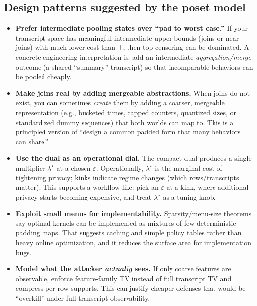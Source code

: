 \documentclass[11pt]{article}
\theoremstyle{definition}
\theoremstyle{remark}
\begin{document}
\subsection*{Design patterns suggested by the poset model}
\begin{itemize}[leftmargin=*]
\item \textbf{Prefer intermediate pooling states over ``pad to worst case.''}
If your transcript space has meaningful intermediate upper bounds (joins or near-joins) with much lower cost than $\top$, then top-censoring can be dominated.
A concrete engineering interpretation is: add an intermediate \emph{aggregation/merge} outcome (a shared ``summary'' transcript) so that incomparable behaviors can be pooled cheaply.
\item \textbf{Make joins real by adding mergeable abstractions.}
When joins do not exist, you can sometimes \emph{create} them by adding a coarser, mergeable representation (e.g., bucketed times, capped counters, quantized sizes, or standardized dummy sequences) that both worlds can map to.
This is a principled version of ``design a common padded form that many behaviors can share.''
\item \textbf{Use the dual as an operational dial.}
The compact dual produces a single multiplier $\lambda^\star$ at a chosen $\varepsilon$.
Operationally, $\lambda^\star$ is the marginal cost of tightening privacy; kinks indicate regime changes (which rows/transcripts matter).
This supports a workflow like: pick an $\varepsilon$ at a kink, where additional privacy starts becoming expensive, and treat $\lambda^\star$ as a tuning knob.
\item \textbf{Exploit small menus for implementability.}
Sparsity/menu-size theorems say optimal kernels can be implemented as mixtures of few deterministic padding maps.
That suggests caching and simple policy tables rather than heavy online optimization, and it reduces the surface area for implementation bugs.
\item \textbf{Model what the attacker \emph{actually} sees.}
If only coarse features are observable, enforce feature-family TV instead of full transcript TV and compress per-row supports.
This can justify cheaper defenses that would be ``overkill'' under full-transcript observability.
\end{itemize}
\end{document}
